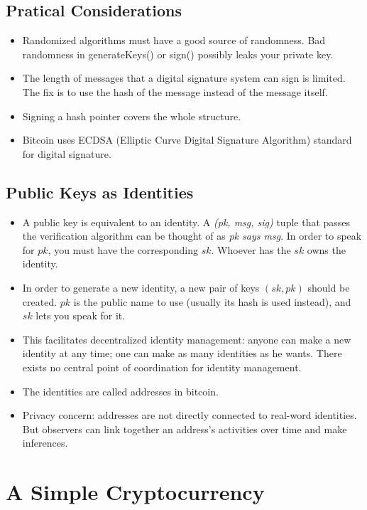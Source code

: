 \subsection{Pratical Considerations}
\begin{itemize}
  \item Randomized algorithms must have a good source of randomness. Bad randomness in generateKeys() or sign() possibly leaks your private key.
  \item The length of messages that a digital signature system can sign is limited. The fix is to use the hash of the message instead of the message itself.
  \item Signing a hash pointer covers the whole structure.
  \item Bitcoin uses ECDSA (Elliptic Curve Digital Signature Algorithm) standard for digital signature.
\end{itemize}
\subsection{Public Keys as Identities}
\begin{itemize}
  \item A public key is equivalent to an identity. A \textit{(pk, msg, sig)} tuple that passes the verification algorithm can be thought of as \textit{pk says msg}. In order to speak for $pk$, you must have the corresponding $sk$. Whoever has the $sk$ owns the identity.
  \item In order to generate a new identity, a new pair of keys $(sk, pk)$ should be created. $pk$ is the public name to use (usually its hash is used instead), and $sk$ lets you speak for it.
  \item This facilitates decentralized identity management: anyone can make a new identity at any time; one can make as many identities as he wants. There exists no central point of coordination for identity management.
  \item The identities are called addresses in bitcoin.
  \item Privacy concern: addresses are not directly connected to real-word identities. But observers can link together an address's activities over time and make inferences.
\end{itemize}
\section{A Simple Cryptocurrency}
\ifx\PREAMBLE\undefined

\fi
